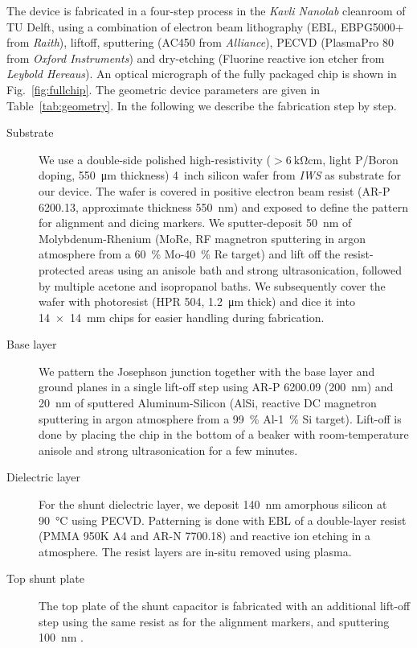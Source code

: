 % 
The device is fabricated in a four-step process in the \textit{Kavli Nanolab} cleanroom of TU Delft, using a combination of electron beam lithography (EBL, EBPG5000+ from \textit{Raith}), liftoff, sputtering (AC450 from \textit{Alliance}), PECVD (PlasmaPro 80 from \textit{Oxford Instruments}) and dry-etching (Fluorine reactive ion etcher from \textit{Leybold Hereaus}).
% 
An optical micrograph of the fully packaged chip is shown in Fig.~\ref{fig:fullchip}.
% 
The geometric device parameters are given in Table~\ref{tab:geometry}.
% 
In the following we describe the fabrication step by step.
\begin{description}
	\item[Substrate] We use a double-side polished high-resistivity ($>\SI{6}{\kilo\ohm\centi\meter}$, light P/Boron doping, \SI{550}{\micro\meter} thickness) \SI{4}{inch} silicon wafer from \textit{IWS} as substrate for our device.
	The wafer is covered in positive electron beam resist (AR-P 6200.13, approximate thickness \SI{550}{\nano\meter}) and exposed to define the pattern for alignment and dicing markers.
	We sputter-deposit \SI{50}{\nano\meter} of Molybdenum-Rhenium (MoRe, RF magnetron sputtering in argon atmosphere from a \SI{60}{\percent} Mo-\SI{40}{\percent} Re target) and lift off the resist-protected areas using an anisole bath and strong ultrasonication, followed by multiple acetone and isopropanol baths.
	We subsequently cover the wafer with photoresist (HPR 504, \SI{1.2}{\micro\meter} thick) and dice it into \SI{14x14}{\milli\meter} chips for easier handling during fabrication.
	\item[Base layer] We pattern the Josephson junction together with the base layer and ground planes in a single lift-off step using AR-P 6200.09 (\SI{200}{\nano\meter}) and \SI{20}{\nano\meter} of sputtered Aluminum-Silicon (AlSi, reactive DC magnetron sputtering in argon atmosphere from a \SI{99}{\percent} Al-\SI{1}{\percent} Si target).
	Lift-off is done by placing the chip in the bottom of a beaker with room-temperature anisole and strong ultrasonication for a few minutes.
	\item[Dielectric layer] For the shunt dielectric layer, we deposit \SI{140}{\nano\meter} amorphous silicon at \SI{90}{\celsius} using PECVD.
	Patterning is done with EBL of a double-layer resist (PMMA 950K A4 and AR-N 7700.18) and reactive ion etching in a  atmosphere.
	The resist layers are in-situ removed using  plasma.
	\item[Top shunt plate] The top plate of the shunt capacitor is fabricated with an additional lift-off step using the same resist as for the alignment markers, and sputtering \SI{100}{\nano\meter} .

\end{description}
